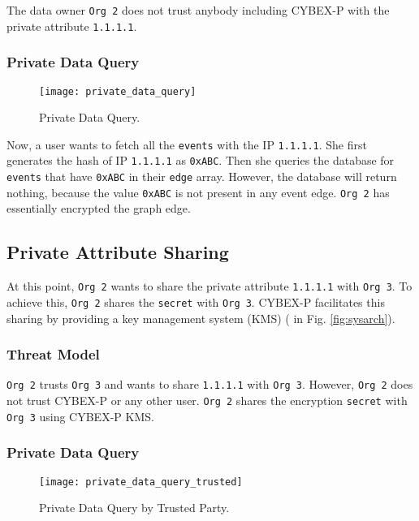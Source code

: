 The data owner \texttt{Org 2} does not trust anybody including CYBEX-P with the private attribute \texttt{1.1.1.1}.

\subsubsection*{\textbf{Private Data Query}}

\begin{figure}[ht]
	\texttt{[image: private\_data\_query]} %
	\centering
	\caption{Private Data Query.}
	\label{fig:privque}
\end{figure}

Now, a user wants to fetch all the \texttt{events} with the IP \texttt{1.1.1.1}. She first generates the hash of IP \texttt{1.1.1.1} as \texttt{0xABC}. Then she queries the database for \texttt{events} that have \texttt{0xABC} in their \texttt{edge} array. However, the database will return nothing, because the value \texttt{0xABC} is not present in any event edge. \texttt{Org 2} has essentially encrypted the graph edge.

\subsection{Private Attribute Sharing}

At this point, \texttt{Org 2} wants to share the private attribute \texttt{1.1.1.1} with \texttt{Org 3}. To achieve this, \texttt{Org 2} shares the \texttt{secret} with \texttt{Org 3}. CYBEX-P facilitates this sharing by providing a key management system (KMS) ( in Fig. \ref{fig:sysarch}).

\subsubsection*{\textbf{Threat Model}}

\texttt{Org 2} trusts \texttt{Org 3} and wants to share \texttt{1.1.1.1} with \texttt{Org 3}. However, \texttt{Org 2} does not trust CYBEX-P or any other user. \texttt{Org 2} shares the encryption \texttt{secret} with \texttt{Org 3} using CYBEX-P KMS.

\subsubsection*{\textbf{Private Data Query}}\label{sss:privq}

\begin{figure}[ht]
	\texttt{[image: private\_data\_query\_trusted]} %
	\centering
	\caption{Private Data Query by Trusted Party.}
	\label{fig:privquetrusted}
\end{figure}

